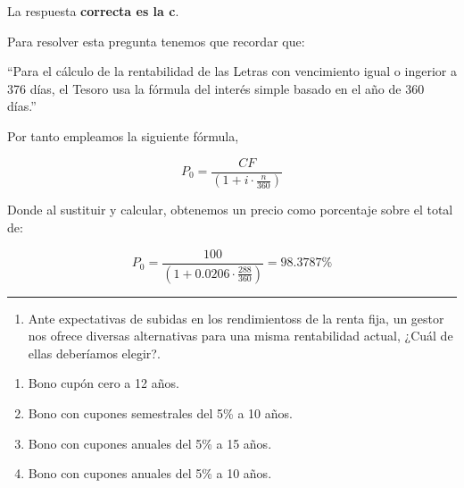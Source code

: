 \documentclass[
  letterpaper,
  DIV=11,
  numbers=noendperiod]{scrreprt}
\providecommand{\tightlist}{%
  \setlength{\itemsep}{0pt}\setlength{\parskip}{0pt}}\usepackage{longtable,booktabs,array}
\begin{document}
\begin{tcolorbox}[enhanced jigsaw, left=2mm, opacityback=0, colback=white, breakable, arc=.35mm, bottomrule=.15mm, rightrule=.15mm, toprule=.15mm, leftrule=.75mm, colframe=quarto-callout-tip-color-frame]
\begin{minipage}[t]{5.5mm}
\textcolor{quarto-callout-tip-color}{\faLightbulb}
\end{minipage}%
\begin{minipage}[t]{\textwidth - 5.5mm}

La respuesta \textbf{correcta es la c}.

Para resolver esta pregunta tenemos que recordar que:

``Para el cálculo de la rentabilidad de las Letras con vencimiento igual
o ingerior a 376 días, el Tesoro usa la fórmula del interés simple
basado en el año de 360 días.''

Por tanto empleamos la siguiente fórmula,

\[P_0=\frac{CF}{\left(1+i\cdot\frac{n}{360}\right)}\]

Donde al sustituir y calcular, obtenemos un precio como porcentaje sobre
el total de:

\[P_0=\frac{100}{\left(1+0.0206\cdot\frac{288}{360}\right)}=98.3787\%\]

\end{minipage}%
\end{tcolorbox}

\begin{center}\rule{0.5\linewidth}{0.5pt}\end{center}

\begin{enumerate}
\def\labelenumi{\arabic{enumi}.}
\setcounter{enumi}{95}
\tightlist
\item
  Ante expectativas de subidas en los rendimientoss de la renta fija, un
  gestor nos ofrece diversas alternativas para una misma rentabilidad
  actual, ¿Cuál de ellas deberíamos elegir?.
\end{enumerate}

\begin{enumerate}
\def\labelenumi{\alph{enumi})}
\item
  Bono cupón cero a 12 años.
\item
  Bono con cupones semestrales del 5\% a 10 años.
\item
  Bono con cupones anuales del 5\% a 15 años.
\item
  Bono con cupones anuales del 5\% a 10 años.
\end{enumerate}
\end{document}
